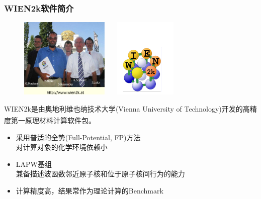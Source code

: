 \documentclass[cjk,slidestop,compress,mathserif,blue]{beamer}
\newcommand{\upcite}[1]{\hspace{0ex}\textsuperscript{\cite{#1}}} %
\begin{document}
\small
\frame
{
	\frametitle{\textrm{WIEN2k}软件简介}
\begin{figure}[h!]
\centering
\vspace*{-0.16in}
\includegraphics[height=1.5in]{Figures/WIEN2k-Group.png}
\hskip 0.5pt
\includegraphics[height=1.5in,width=1.6in,viewport=13 35 475 515,clip]{Figures/logo_WIEN2k.pdf}
\label{Logo_of_WIEN2k}
\end{figure}
\textrm{WIEN2k}是由奥地利维也纳技术大学\textrm{(Vienna University of Technology)}开发的高精度第一原理材料计算软件包\upcite{WIEN2K-UG_2001}。%
\begin{itemize}
	\item 采用普适的全势\textrm{(Full-Potential, FP)}方法\\对计算对象的化学环境依赖小
	\item \textrm{LAPW}基组\\兼备描述波函数邻近原子核和位于原子核间行为的能力
	\item 计算精度高，结果常作为理论计算的\textrm{Benchmark}
\end{itemize}
}
\end{document}
